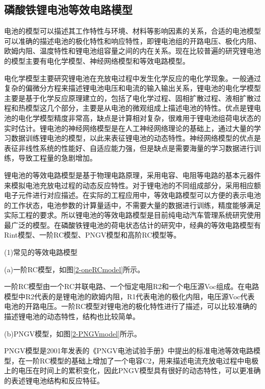 \subsection{磷酸铁锂电池等效电路模型}
电池的模型可以描述其工作特性与环境、材料等影响因素的关系，合适的电池模型可以准确的描述电池的极化特性和响应特性，即锂电池组的开路电压、极化内阻、欧姆内阻、温度特性和锂电池组容量之间的内在关系。现在比较普遍的研究锂电池的模型主要有电化学模型、神经网络模型和等效电路模型。

电化学模型主要研究锂电池在充放电过程中发生化学反应的电化学现象。一般通过复杂的偏微分方程来描述锂电池电压和电流的输入输出关系，锂电池的电化学模型主要是基于化学反应原理建立的，包括了电化学过程、固相扩散过程、液相扩散过程和热模型这几个部分，主要是从电池的微观组成上描述电池的特性。优点是锂电池的电化学模型精度非常高，缺点是计算相对复杂，很难用于锂电池组荷电状态的实时估计。锂电池的神经网络模型是在人工神经网络理论的基础上，通过大量的学习数据训练锂电池的模型，以此来表征锂电池的动态特性。神经网络模型的优点是表征非线性系统的性能好、自适应能力强，但是缺点是需要海量的学习数据进行训练，导致工程量的急剧增加。

锂电池的等效电路模型是基于物理电路原理，采用电容、电阻等电路的基本元器件来模拟电池充放电过程的动态反应特性。对于锂电池的不同组成部分，采用相应额电子元件进行对应描述。在实际的工程应用中，等效电路模型可以方便的表示电池的工作状态，电池参数的计算量适中，不需要大量的数据进行训练，精度能够满足实际工程的要求。所以锂电池的等效电路模型是目前纯电动汽车管理系统研究使用最广泛的模型。在磷酸铁锂电池的荷电状态估计的研究中，经典的等效电路模型有Rint模型、一阶RC模型、PNGV模型和高阶RC模型等。

(1){常见的等效电路模型}

(a)一阶RC模型，如图\ref{2-oneRCmodel}所示。

一阶RC模型由一个RC并联电路、一个恒定电阻R2和一个电压源Voc组成。在电路模型中R2代表的是锂电池的欧姆内阻，R1代表电池的极化内阻，电压源Voc代表电池的开路电压。一阶RC模型对锂电池的极化特性进行了描述，可以比较准确的描述锂电池的动态特性，结构也比较简单。

(b)PNGV模型，如图\ref{2-PNGVmodel}所示。

PNGV模型是2001年发表的《PNGV电池试验手册》中提出的标准电池等效电路模型，在一阶RC模型的基础上增加了一个电容C2，用来描述电流充放电过程中电极上的电压在时间上的累积变化，因此PNGV模型具有很好的动态特性，可以更准确的表述锂电池结构和反应特征。

